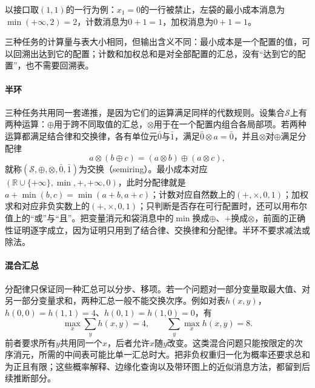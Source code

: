 以接口取$(1,1)$的一行为例：$x_1=0$的一行被禁止，左袋的最小成本消息为$\min(+\infty,2)=2$，计数消息为$0+1=1$，加权消息为$0+1=1$。

三种任务的计算量与表大小相同，但输出含义不同：最小成本是一个配置的值，可以回溯出达到它的配置；计数和加权总和是对全部配置的汇总，没有“达到它的配置”，也不需要回溯表。

\paragraph{半环}
三种任务共用同一套递推，是因为它们的运算满足同样的代数规则。设集合$\mathcal S$上有两种运算：$\oplus$用于跨不同取值的汇总，$\otimes$用于在一个配置内组合各局部项。若两种运算都满足结合律和交换律，各有单位元$\bar0$与$\bar1$，满足$\bar0\otimes a=\bar0$，并且$\otimes$对$\oplus$满足分配律
\[
a\otimes(b\oplus c)=(a\otimes b)\oplus(a\otimes c),
\]
就称$(\mathcal S,\allowbreak\oplus,\allowbreak\otimes,\allowbreak\bar0,\allowbreak\bar1)$为交换（semiring）。最小成本对应$(\mathbb R\cup\{+\infty\},\allowbreak\min,\allowbreak+,\allowbreak+\infty,\allowbreak0)$，此时分配律就是$a+\min(b,c)=\min(a+b,a+c)$；计数对应自然数上的$(+,\times,0,1)$；加权求和对应非负实数上的$(+,\times,0,1)$；只判断是否存在可行配置时，还可以用布尔值上的“或”与“且”。把变量消元和袋消息中的$\min$换成$\oplus$、$+$换成$\otimes$，前面的正确性证明逐字成立，因为证明只用到了结合律、交换律和分配律。半环不要求减法或除法。

\paragraph{混合汇总}
分配律只保证同一种汇总可以分步、移项。若一个问题对一部分变量取最大值、对另一部分变量求和，两种汇总一般不能交换次序。例如对表$h(x,y)$，$h(0,0)=h(1,1)=4$、$h(0,1)=h(1,0)=0$，有
\[
\max_x\sum_y h(x,y)=4,\qquad \sum_y\max_x h(x,y)=8 .
\]
前者要求所有$y$共用同一个$x$，后者允许$x$随$y$改变。这类混合问题只能按限定的次序消元，所需的中间表可能比单一汇总时大。把非负权重归一化为概率还要求总和为正且有限；这些概率解释、边缘化查询以及带环图上的近似消息方法，都留到后续推断部分。
